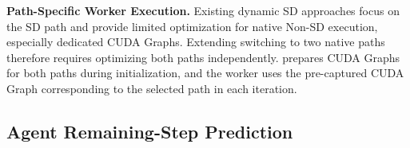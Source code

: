 \textbf{Path-Specific Worker Execution.}
Existing dynamic SD approaches focus on the SD path and provide limited optimization for native Non-SD execution, especially dedicated CUDA Graphs. Extending switching to two native paths therefore requires optimizing both paths independently. 
\sysname prepares CUDA Graphs for both paths during initialization, and the worker uses the pre-captured CUDA Graph corresponding to the selected path in each iteration.



\subsection{Agent Remaining-Step Prediction}
\label{sec:4.2}

